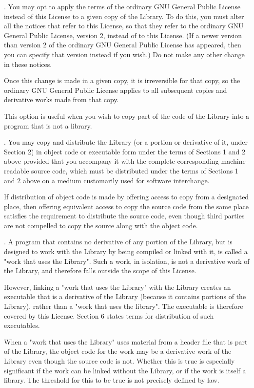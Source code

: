 . You may opt to apply the terms of the ordinary GNU General Public License instead of this License to a given copy of the Library. To do this, you must alter all the notices that refer to this License, so that they refer to the ordinary GNU General Public License, version 2, instead of to this License. (If a newer version than version 2 of the ordinary GNU General Public License has appeared, then you can specify that version instead if you wish.) Do not make any other change in these notices. 

Once this change is made in a given copy, it is irreversible for that copy, so the ordinary GNU General Public License applies to all subsequent copies and derivative works made from that copy. 

This option is useful when you wish to copy part of the code of the Library into a program that is not a library. 

. You may copy and distribute the Library (or a portion or derivative of it, under Section 2) in object code or executable form under the terms of Sections 1 and 2 above provided that you accompany it with the complete corresponding machine-readable source code, which must be distributed under the terms of Sections 1 and 2 above on a medium customarily used for software interchange. 

If distribution of object code is made by offering access to copy from a designated place, then offering equivalent access to copy the source code from the same place satisfies the requirement to distribute the source code, even though third parties are not compelled to copy the source along with the object code. 

. A program that contains no derivative of any portion of the Library, but is designed to work with the Library by being compiled or linked with it, is called a "work that uses the Library". Such a work, in isolation, is not a derivative work of the Library, and therefore falls outside the scope of this License. 

However, linking a "work that uses the Library" with the Library creates an executable that is a derivative of the Library (because it contains portions of the Library), rather than a "work that uses the library". The executable is therefore covered by this License. Section 6 states terms for distribution of such executables. 

When a "work that uses the Library" uses material from a header file that is part of the Library, the object code for the work may be a derivative work of the Library even though the source code is not. Whether this is true is especially significant if the work can be linked without the Library, or if the work is itself a library. The threshold for this to be true is not precisely defined by law. 

